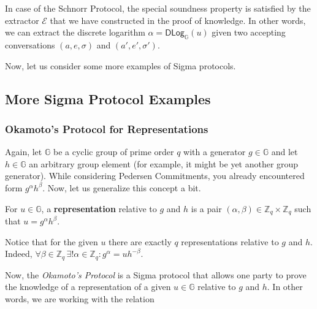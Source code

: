 \documentclass[../lecture-notes.tex]{subfiles}
\begin{document}
\begin{example}
    In case of the Schnorr Protocol, the special soundness property is satisfied by the extractor $\mathcal{E}$ that we have constructed in the proof of knowledge. In other words, we can extract the discrete logarithm $\alpha = \mathsf{DLog}_{\mathbb{G}}(u)$ given two accepting conversations $(a,e,\sigma)$ and $(a',e',\sigma')$.
\end{example}

Now, let us consider some more examples of Sigma protocols.

\subsection{More Sigma Protocol Examples}

\subsubsection{Okamoto's Protocol for Representations}

Again, let $\mathbb{G}$ be a cyclic group of prime order $q$ with a generator $g \in \mathbb{G}$ and let $h \in \mathbb{G}$ an arbitrary group element (for example, it might be yet another group generator). While considering Pedersen Commitments, you already encountered form $g^{\alpha}h^{\beta}$. Now, let us generalize this concept a bit.

\begin{definition}
    For $u \in \mathbb{G}$, a \textbf{representation} relative to $g$ and $h$ is a pair $(\alpha,\beta) \in \mathbb{Z}_q \times \mathbb{Z}_q$ such that $u=g^{\alpha}h^{\beta}$.
\end{definition}

\begin{remark}
    Notice that for the given $u$ there are exactly $q$ representations relative to $g$ and $h$. Indeed, $\forall \beta \in \mathbb{Z}_q \, \exists! \alpha \in \mathbb{Z}_q: g^{\alpha} = uh^{-\beta}$. 
\end{remark}

\vspace{-1mm}

Now, the \textit{Okamoto's Protocol} is a Sigma protocol that allows one party to prove the knowledge of a representation of a given $u \in \mathbb{G}$ relative to $g$ and $h$. In other words, we are working with the relation

\vspace{-1mm}
\end{document}
